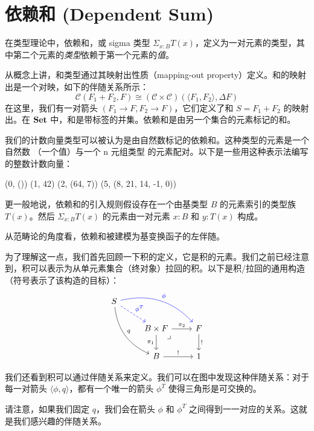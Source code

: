 \documentclass[DaoFP]{subfiles}
\begin{document}
  \section{依赖和 (Dependent Sum)}

  在类型理论中，依赖和，或 sigma 类型 $\Sigma_{x : B} T(x)$，定义为一对元素的类型，其中第二个元素的\emph{类型}依赖于第一个元素的\emph{值}。

  从概念上讲，和类型通过其映射出性质（mapping-out property）定义。和的映射出是一个对映，如下的伴随关系所示：
  \[ \mathcal{C}(F_1 + F_2, F) \cong (\mathcal{C} \times \mathcal{C}) (\langle F_1, F_2 \rangle, \Delta F) \]
  在这里，我们有一对箭头 $(F_1 \to F, F_2 \to F)$，它们定义了和 $S = F_1 + F_2$ 的映射出。在 $\mathbf{Set}$ 中，和是带标签的并集。依赖和是由另一个集合的元素标记的和。

  我们的计数向量类型可以被认为是由自然数标记的依赖和。这种类型的元素是一个自然数 （一个值）与一个 n 元组类型  的元素配对。以下是一些用这种表示法编写的整数计数向量：
  \begin{haskell}
   (0, ())
   (1, 42)
   (2, (64, 7))
   (5, (8, 21, 14, -1, 0))
  \end{haskell}

  更一般地说，依赖和的引入规则假设存在一个由基类型 $B$ 的元素索引的类型族 $T(x)$。然后 $\Sigma_{x : B} T(x)$ 的元素由一对元素 $x \colon B$ 和 $y \colon T(x)$ 构成。

  从范畴论的角度看，依赖和被建模为基变换函子的左伴随。

  为了理解这一点，我们首先回顾一下积的定义，它是积的元素。我们之前已经注意到，积可以表示为从单元素集合（终对象）拉回的积。以下是积/拉回的通用构造（符号表示了该构造的目标）：
  \[
   \begin{tikzcd}
    S
    \arrow[dr, blue, dashed, "\phi^T"]
    \arrow[drr, blue, bend left, "\phi"]
    \arrow[ddr, bend right, "q"]
    \\
    &B \times F
    \arrow[dr, phantom,  , very near start, "\lrcorner"]
    \arrow[r, "\pi_2"]
    \arrow[d, "\pi_1"']
    &F
    \arrow[d, "!"]
    \\
    &B
    \arrow[r, "!"]
    &1
   \end{tikzcd}
  \]

  我们还看到积可以通过伴随关系来定义。我们可以在图中发现这种伴随关系：对于每一对箭头 $\langle \phi, q \rangle$，都有一个唯一的箭头 $\phi^T$ 使得三角形是可交换的。

  请注意，如果我们固定 $q$，我们会在箭头 $\phi$ 和 $\phi^T$ 之间得到一一对应的关系。这就是我们感兴趣的伴随关系。
\end{document}
